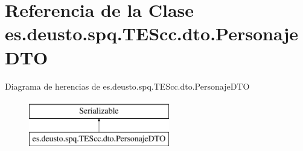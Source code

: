 \hypertarget{classes_1_1deusto_1_1spq_1_1_t_e_scc_1_1dto_1_1_personaje_d_t_o}{\section{Referencia de la Clase es.\+deusto.\+spq.\+T\+E\+Scc.\+dto.\+Personaje\+D\+T\+O}
\label{classes_1_1deusto_1_1spq_1_1_t_e_scc_1_1dto_1_1_personaje_d_t_o}
}
Diagrama de herencias de es.\+deusto.\+spq.\+T\+E\+Scc.\+dto.\+Personaje\+D\+T\+O\begin{figure}[H]
\begin{center}
\leavevmode
\includegraphics[height=2.000000cm]{classes_1_1deusto_1_1spq_1_1_t_e_scc_1_1dto_1_1_personaje_d_t_o}
\end{center}
\end{figure}
